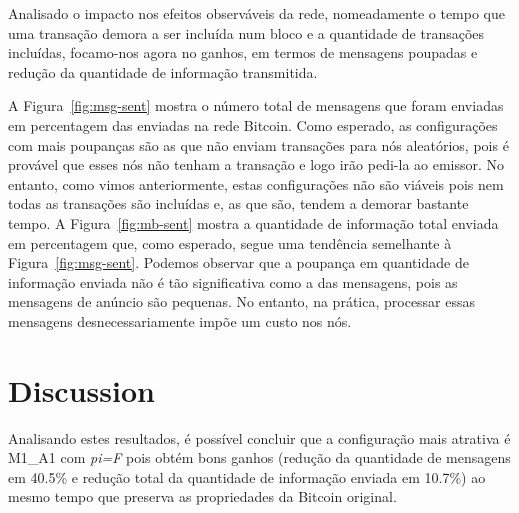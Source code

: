Analisado o impacto nos efeitos observáveis da rede, nomeadamente o tempo que uma transação demora a ser incluída num bloco e a quantidade de transações incluídas, focamo-nos agora no ganhos, em termos de mensagens poupadas e redução da quantidade de informação transmitida.


A Figura~\ref{fig:msg-sent} mostra o número total de mensagens que foram enviadas em percentagem das enviadas na rede Bitcoin.
Como esperado, as configurações com mais poupanças são as que não enviam transações para nós aleatórios, pois é provável que esses nós não tenham a transação e logo irão pedi-la ao emissor.
No entanto, como vimos anteriormente, estas configurações não são viáveis pois nem todas as transações são incluídas e, as que são, tendem a demorar bastante tempo.
A Figura~\ref{fig:mb-sent} mostra a quantidade de informação total enviada em percentagem que, como esperado, segue uma tendência semelhante à Figura~\ref{fig:msg-sent}.
Podemos observar que a poupança em quantidade de informação enviada não é tão significativa como a das mensagens, pois as mensagens de anúncio são pequenas.
No entanto, na prática, processar essas mensagens desnecessariamente impõe um custo nos nós.

\section{Discussion}
Analisando estes resultados, é possível concluir que a configuração mais atrativa é M1\_A1 com \textsl{pi=F} pois obtém bons ganhos
(redução da quantidade de mensagens em 40.5\% e  redução total da quantidade de informação enviada em 10.7\%) ao mesmo tempo que preserva as propriedades da Bitcoin original.
